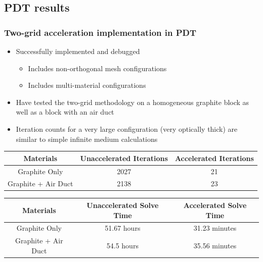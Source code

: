 \documentclass[compress,10pt]{beamer}
\begin{document}
\subsection{PDT results}
\begin{frame}[t]\frametitle{Two-grid acceleration implementation in PDT}
\begin{block}{}
\begin{itemize}
	\item Successfully implemented and debugged
	\begin{itemize}
		\item Includes non-orthogonal  mesh configurations
		\item Includes multi-material configurations
	\end{itemize}
	\item Have tested the two-grid methodology on a homogeneous graphite block as well as a block with an air duct
	\item Iteration counts for a very large configuration (very optically thick) are similar to simple infinite medium calculations
\end{itemize}
\end{block}
\centering

\vspace{3mm}
\begin{table}
\footnotesize
\begin{tabular}{|c|c|c|}
\hline
Materials & Unaccelerated Iterations & Accelerated Iterations  \\
\hline \hline
Graphite Only & 2027 & 21 \\ \hline
Graphite + Air Duct & 2138 & 23 \\ \hline
\end{tabular}
\end{table}

\vspace{3mm}
\begin{table}
\footnotesize
\begin{tabular}{|c|c|c|}
\hline
Materials & Unaccelerated Solve Time  & Accelerated Solve Time  \\
\hline \hline
Graphite Only & 51.67 hours & 31.23 minutes \\ \hline
Graphite + Air Duct & 54.5 hours & 35.56 minutes \\ \hline
\end{tabular}
\end{table}


\end{frame}
\typeout{***********************************************************************************}
\end{document}
